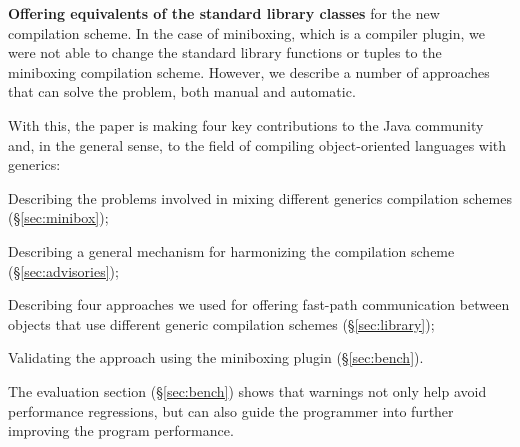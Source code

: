 \textbf{Offering equivalents of the standard library classes} for the new compilation scheme. In the case of miniboxing, which is a compiler plugin, we were not able to change the standard library functions or tuples to the miniboxing compilation scheme. However, we describe a number of approaches that can solve the problem, both manual and automatic.

With this, the paper is making four key contributions to the Java community and, in the general sense, to the field of compiling object-oriented languages with generics:

\begin{compactitem}
  \item Describing the problems involved in mixing different generics compilation schemes (\S\ref{sec:minibox});
  \item Describing a general mechanism for harmonizing the compilation scheme (\S\ref{sec:advisories});
  \item Describing four approaches we used for offering fast-path communication between objects that use different generic compilation schemes (\S\ref{sec:library});
  \item Validating the approach using the miniboxing plugin (\S\ref{sec:bench}).
\end{compactitem}

The evaluation section (\S\ref{sec:bench}) shows that warnings not only help avoid performance regressions, but can also guide the programmer into further improving the program performance.